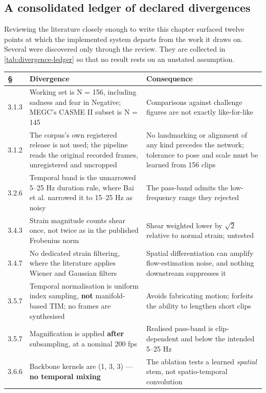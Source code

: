 \subsection{A consolidated ledger of declared divergences}
\label{sec:divergence-ledger}

Reviewing the literature closely enough to write this chapter surfaced twelve points at which the implemented system departs from the work it draws on. Several were discovered only through the review. They are collected in \autoref{tab:divergence-ledger} so that no result rests on an unstated assumption.

\begin{table}[htbp]
	\centering
	\footnotesize
	\begin{tabular}{@{}p{0.85cm} p{6.0cm} p{6.6cm}@{}}
		\hline
		\textbf{\S} & \textbf{Divergence} & \textbf{Consequence} \\
		\hline
		3.1.3 & Working set is N = 156, including sadness and fear in Negative; MEGC's CASME II subset is N = 145 & Comparisons against challenge figures are not exactly like-for-like \\
		3.1.2 & The corpus's own registered release is not used; the pipeline reads the original recorded frames, unregistered and uncropped & No landmarking or alignment of any kind precedes the network; tolerance to pose and scale must be learned from 156 clips \\
		3.2.6 & Temporal band is the unnarrowed 5--25 Hz duration rule, where Bai et al. narrowed it to 15--25 Hz as noisy & The pass-band admits the low-frequency range they rejected \\
		3.4.3 & Strain magnitude counts shear once, not twice as in the published Frobenius norm & Shear weighted lower by $\sqrt{2}$ relative to normal strain; untested \\
		3.4.7 & No dedicated strain filtering, where the literature applies Wiener and Gaussian filters & Spatial differentiation can amplify flow-estimation noise, and nothing downstream suppresses it \\
		3.5.7 & Temporal normalisation is uniform index sampling, \textbf{not} manifold-based TIM; no frames are synthesised & Avoids fabricating motion; forfeits the ability to lengthen short clips \\
		3.5.7 & Magnification is applied \textbf{after} subsampling, at a nominal 200 fps & Realised pass-band is clip-dependent and below the intended 5--25 Hz \\
		3.6.6 & Backbone kernels are (1, 3, 3) --- \textbf{no temporal mixing} & The ablation tests a learned \textit{spatial} stem, not spatio-temporal convolution \\

\end{tabular}
\end{table}

